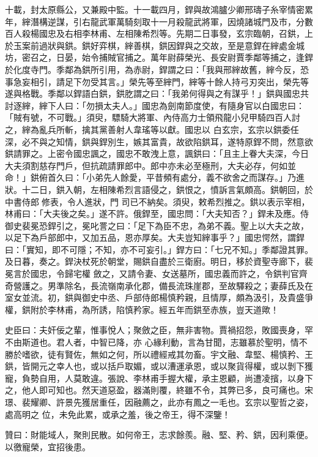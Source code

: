 \begin{pinyinscope}
 十載，封太原縣公，又兼殿中監。十一載四月，銲與故鴻臚少卿邢璹子糸宰情密累年，縡潛構逆謀，引右龍武軍萬騎刻取十一月殺龍武將軍，因燒諸城門及市，分數百人殺楊國忠及右相李林甫、左相陳希烈等。先期二日事發，玄宗臨朝，召鉷，上於玉案前過狀與鉷。鉷好弈棋，縡善棋，鉷因銲與之交故，至是意銲在縡處金城坊，密召之，日晏，始令捕賊官捕之。萬年尉薛榮光、長安尉賈季鄰等捕之，逢銲
 於化度寺門。季鄰為鉷所引用，為赤尉，銲謂之曰：「我與邢縡故舊，縡今反，恐事急妄相引，請足下勿受其言。」榮先等至縡門，縡等十餘人持弓刃突出，榮先等遂與格戰。季鄰以銲語白鉷，鉷肐謂之曰：「我弟何得與之有謀乎！」鉷與國忠共討逐縡，縡下人曰：「勿損太夫人。」國忠為劍南節度使，有隨身官以白國忠曰：「賊有號，不可戰。」須臾，驃騎大將軍、內侍高力士領飛龍小兒甲騎四百人討之，縡為亂兵所斬，擒其黨善射人韋瑤等以獻。國忠以
 白玄宗，玄宗以鉷委任深，必不與之知情，鉷與銲別生，嫉其富貴，故欲陷鉷耳，遂特原銲不問，然意欲鉷請罪之。上密令國忠諷之，國忠不敢洩上意，諷鉷曰：「且主上眷大夫深，今日大夫須割慈存門戶，但抗疏請罪郎中。郎中亦未必至極刑，大夫必存，何如並命！」鉷俯首久曰：「小弟先人餘愛，平昔頻有處分，義不欲舍之而謀存。」乃進狀。十二日，鉷入朝，左相陳希烈言語侵之，鉷恨之，憤訴言氣頗高。鉷朝回，於中書侍郎修表，令人進狀，門
 司已不納矣。須臾，敕希烈推之。鉷以表示宰相，林甫曰：「大夫後之矣。」遂不許。俄銲至，國忠問：「大夫知否？」銲未及應。侍御史裴冕恐銲引之，冕叱詈之曰：「足下為臣不忠，為弟不義。聖上以大夫之故，以足下為戶部郎中，又加五品，恩亦厚矣。大夫豈知縡事乎？」國忠愕然，謂銲曰：「實知，即不可隱；不知，亦不可妄引。」銲方曰：「七兄不知。」季鄰證其罪。及日暮，奏之。銲決杖死於朝堂，賜鉷自盡於三衛廚。明日，移於資聖寺廊下，裴冕言於國忠，令歸宅權
 斂之，又請令妻、女送墓所，國忠義而許之，令鉷判官齊奇營護之。男準除名，長流嶺南承化郡，備長流珠崖郡，至故驛殺之；妻薛氏及在室女並流。初，鉷與御史中丞、戶部侍郎楊慎矜親，且情厚，頗為汲引，及貴盛爭權，鉷附於李林甫，為所誘，陷慎矜家。經五年而鉷至赤族，豈天道歟！



 史臣曰：夫奸佞之輩，惟事悅人；聚斂之臣，無非害物。賈禍招怨，敗國喪身，罕不由斯道也。君人者，中智已降，亦
 心緣利動，言為甘聞，志雖慕於聖明，情不勝於嗜欲，徒有賢佐，無如之何，所以禮經戒其勿畜。宇文融、韋堅、楊慎矜、王鉷，皆開元之幸人也，或以括戶取媚，或以漕運承恩，或以聚貨得權，或以剝下獲寵，負勢自用，人莫敢違。張說、李林甫手握大權，承主恩顧，尚遭凌擯，以身下之，他人即可知也。然天道惡盈，器滿則覆，終雖不令，其弊已多，良可痛也。宋璟、裴耀卿、許景先獲居重任，因融薦之，此亦有鳳之一毛也。玄宗以聖哲之姿，處高明之
 位，未免此累，或承之羞，後之帝王，得不深鑒！



 贊曰：財能域人，聚則民散。如何帝王，志求餘羨。融、堅、矜、鉷，因利乘便。以徼寵榮，宜招後患。



\end{pinyinscope}